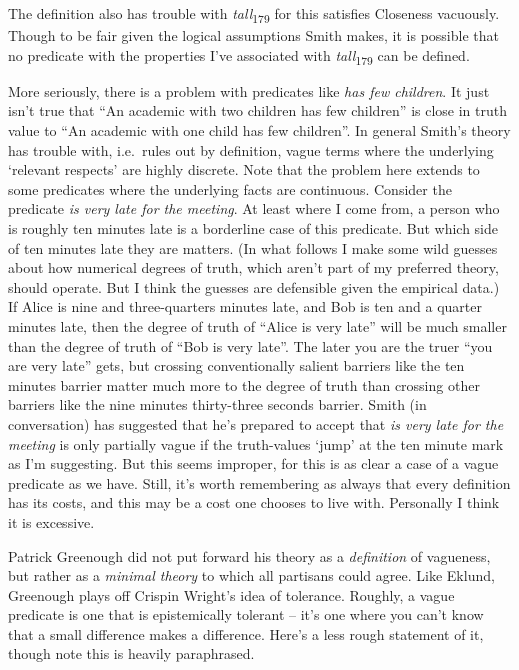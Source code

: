 \documentclass[
  11pt,
  letterpaper,
  DIV=11,
  numbers=noendperiod,
  twoside]{scrartcl}
\begin{document}
The definition also has trouble with \emph{tall}\textsubscript{179} for
this satisfies Closeness vacuously. Though to be fair given the logical
assumptions Smith makes, it is possible that no predicate with the
properties I've associated with \emph{tall}\textsubscript{179} can be
defined.

More seriously, there is a problem with predicates like \emph{has few
children}. It just isn't true that ``An academic with two children has
few children'' is close in truth value to ``An academic with one child
has few children''. In general Smith's theory has trouble with,
i.e.~rules out by definition, vague terms where the underlying `relevant
respects' are highly discrete. Note that the problem here extends to
some predicates where the underlying facts are continuous. Consider the
predicate \emph{is very late for the meeting}. At least where I come
from, a person who is roughly ten minutes late is a borderline case of
this predicate. But which side of ten minutes late they are matters. (In
what follows I make some wild guesses about how numerical degrees of
truth, which aren't part of my preferred theory, should operate. But I
think the guesses are defensible given the empirical data.) If Alice is
nine and three-quarters minutes late, and Bob is ten and a quarter
minutes late, then the degree of truth of ``Alice is very late'' will be
much smaller than the degree of truth of ``Bob is very late''. The later
you are the truer ``you are very late'' gets, but crossing
conventionally salient barriers like the ten minutes barrier matter much
more to the degree of truth than crossing other barriers like the nine
minutes thirty-three seconds barrier. Smith (in conversation) has
suggested that he's prepared to accept that \emph{is very late for the
meeting} is only partially vague if the truth-values `jump' at the ten
minute mark as I'm suggesting. But this seems improper, for this is as
clear a case of a vague predicate as we have. Still, it's worth
remembering as always that every definition has its costs, and this may
be a cost one chooses to live with. Personally I think it is excessive.

Patrick Greenough did not put forward his theory as a \emph{definition}
of vagueness, but rather as a \emph{minimal theory} to which all
partisans could agree. Like Eklund, Greenough plays off Crispin Wright's
idea of tolerance. Roughly, a vague predicate is one that is
epistemically tolerant -- it's one where you can't know that a small
difference makes a difference. Here's a less rough statement of it,
though note this is heavily paraphrased.
\end{document}
